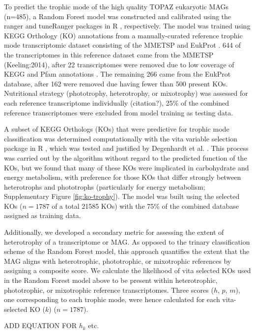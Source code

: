 \documentclass[12pt]{article}
\numberwithin{equation}{section}
\begin{document}
To predict the trophic mode of the high quality TOPAZ eukaryotic MAGs (n=485), a Random Forest model \citep{Breiman_2001} was constructed and calibrated using the ranger \citep{Wright_2017} and tuneRanger packages in R \citep{tuneRanger}, respectively. The model was trained using KEGG Orthology (KO) annotations \citep{Kanehisa_2019} from a manually-curated reference trophic mode transcriptomic dataset consisting of the MMETSP \citep{Keeling2014} and EukProt \citep{Richter2020EukProt}. 644 of the transcriptomes in this reference dataset came from the MMETSP (Keeling:2014), after 22 transcriptomes were removed due to low coverage of KEGG and Pfam annotations \citep{Finn2014Pfam}. The remaining 266 came from the EukProt database, after 162 were removed due having fewer than 500 present KOs. Nutritional strategy (phototrophy, heterotrophy, or mixotrophy) was assessed for each reference transcriptome individually (citation?), 25\% of the combined reference transcriptomes were excluded from model training as testing data. 

A subset of KEGG Orthologs (KOs) that were predictive for trophic mode classification was determined computationally with the vita variable selection package in R \citep{Janitza_2016}, which was tested and justified by Degenhardt et al. \citet{Degenhardt_2017}. This process was carried out by the algorithm without regard to the predicted function of the KOs, but we found that many of these KOs were implicated in carbohydrate and energy metabolism, with preference for those KOs that differ strongly between heterotrophs and phototrophs (particularly for energy metabolism; Supplementary Figure \ref{fig:ko-trophy}). The model was built using the selected KOs ($n=1787$ of a total 21585 KOs) with the 75\% of the combined database assigned as training data.

Additionally, we developed a secondary metric for assessing the extent of heterotrophy of a transcriptome or MAG. As opposed to the trinary classification scheme of the Random Forest model, this approach quantifies the extent that the MAG aligns with heterotrophic, phototrophic, or mixotrophic references by assigning a composite score. We calculate the likelihood of vita selected KOs used in the Random Forest model above to be present within heterotrophic, phototrophic, or mixotrophic reference transcriptomes. Three scores ($h$, $p$, $m$), one corresponding to each trophic mode, were hence calculated for each vita-selected  KO ($k$) ($n=1787$). 

ADD EQUATION FOR $h_k$ etc. 
\end{document}
